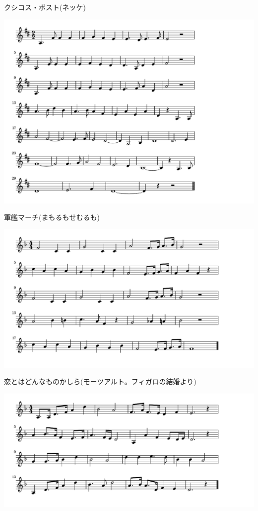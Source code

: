 \documentclass[a4paper]{ltjsarticle}
\begin{document}
\vspace{-10mm} \hspace{10mm}
クシコス・ポスト(ネッケ)

\includegraphics[clip]{gunkan_crop.pdf}

\vspace{-10mm} \hspace{10mm}
軍艦マーチ(まもるもせむるも)

\includegraphics[clip]{koitowadonna_crop.pdf}

\vspace{-10mm} \hspace{10mm}
恋とはどんなものかしら(モーツアルト。フィガロの結婚より)

\includegraphics[clip]{doukinosakura_crop.pdf}
\end{document}
